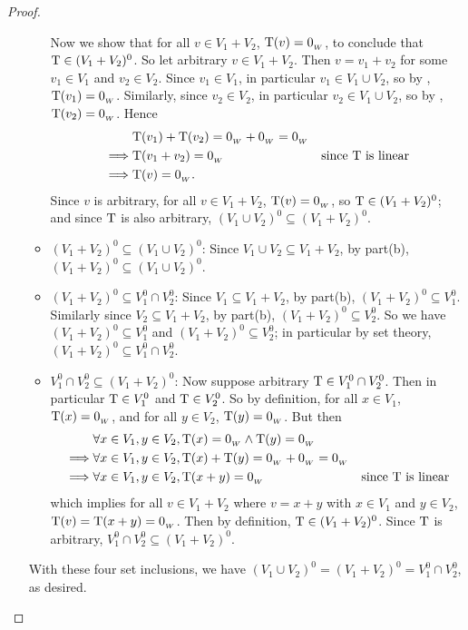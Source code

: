 \begin{proof}
\begin{enumerate}
\begin{itemize}
        Now we show that for all \(v \in V_1 + V_2\), \(\mathrm{T}(v) = 0_{_W}\), to conclude that \(\mathrm{T} \in (V_1 + V_2)^0\).
        So let arbitrary \(v \in V_1 + V_2\).
        Then \(v = v_1 + v_2\) for some \(v_1 \in V_1\) and \(v_2 \in V_2\).
        Since \(v_1 \in V_1\), in particular \(v_1 \in V_1 \cup V_2\), so by , \(\mathrm{T}(v_1) = 0_{_W}\).
        Similarly, since \(v_2 \in V_2\), in particular \(v_2 \in V_1 \cup V_2\), so by , \(\mathrm{T}(v_2) = 0_{_W}\).
        Hence
        \begin{align*}
                     & \mathrm{T}(v_1) + \mathrm{T}(v_2) = 0_{_W} + 0_{_W} = 0_{_W} \\
            \implies & \mathrm{T}(v_1 + v_2) = 0_{_W} & \text{since \(\mathrm{T}\) is linear} \\
            \implies & \mathrm{T}(v) = 0_{_W}.
        \end{align*}
        Since \(v\) is arbitrary, for all \(v \in V_1 + V_2\), \(\mathrm{T}(v) = 0_{_W}\), so \(\mathrm{T} \in (V_1 + V_2)^0\);
        and since \(\mathrm{T}\) is also arbitrary, \((V_1 \cup V_2)^0 \subseteq (V_1 + V_2)^0\).
    \item \((V_1 + V_2)^0 \subseteq (V_1 \cup V_2)^0\):
        Since \(V_1 \cup V_2 \subseteq V_1 + V_2\), by part(b), \((V_1 + V_2)^0 \subseteq (V_1 \cup V_2)^0\).
    \item \((V_1 + V_2)^0 \subseteq V_1^0 \cap V_2^0\):
        Since \(V_1 \subseteq V_1 + V_2\), by part(b), \((V_1 + V_2)^0 \subseteq V_1^0\).
        Similarly since \(V_2 \subseteq V_1 + V_2\), by part(b), \((V_1 + V_2)^0 \subseteq V_2^0\).
        So we have \((V_1 + V_2)^0 \subseteq V_1^0\) and \((V_1 + V_2)^0 \subseteq V_2^0\);
        in particular by set theory, \((V_1 + V_2)^0 \subseteq V_1^0 \cap V_2^0\).
    \item \(V_1^0 \cap V_2^0 \subseteq (V_1 + V_2)^0\):
        Now suppose arbitrary \(\mathrm{T} \in V_1^0 \cap V_2^0\).
        Then in particular \(\mathrm{T} \in V_1^0\) and \(\mathrm{T} \in V_2^0\).
        So by definition, for all \(x \in V_1\), \(\mathrm{T}(x) = 0_{_W}\), and for all \(y \in V_2\), \(\mathrm{T}(y) = 0_{_W}\).
        But then
        \begin{align*}
                     & \forall x \in V_1, y \in V_2, \mathrm{T}(x) = 0_{_W} \land \mathrm{T}(y) = 0_{_W} \\
            \implies & \forall x \in V_1, y \in V_2, \mathrm{T}(x) + \mathrm{T}(y) = 0_{_W} + 0_{_W} = 0_{_W} \\
            \implies & \forall x \in V_1, y \in V_2, \mathrm{T}(x + y) = 0_{_W} & \text{since \(\mathrm{T}\) is linear}
        \end{align*}
        which implies for all \(v \in V_1 + V_2\) where \(v = x + y\) with \(x \in V_1\) and \(y \in V_2\), \(\mathrm{T}(v) = \mathrm{T}(x + y) = 0_{_W}\).
        Then by definition, \(\mathrm{T} \in (V_1 + V_2)^0\).
        Since \(\mathrm{T}\) is arbitrary, \(V_1^0 \cap V_2^0 \subseteq (V_1 + V_2)^0\).
\end{itemize}

With these four set inclusions, we have \((V_1 \cup V_2)^0 = (V_1 + V_2)^0 = V_1^0 \cap V_2^0\), as desired.
\end{enumerate}
\end{proof}

